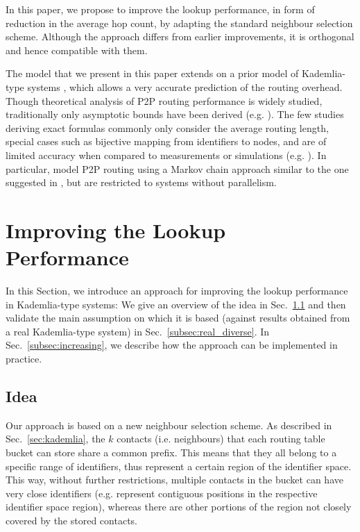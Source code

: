 \documentclass[10pt, conference, compsocconf, letterpaper]{IEEEtran}
\begin{document}
In this paper, we propose to improve the lookup performance, in form of reduction in the average hop count, by adapting the standard neighbour selection scheme. Although the approach differs from earlier improvements, it is orthogonal and hence compatible with them. 
 
The model that we present in this paper extends on a prior model of Kademlia-type systems \cite{roos13comprehending}, which allows a very accurate prediction of the routing overhead.
Though theoretical analysis of P2P routing performance is widely studied, traditionally only asymptotic bounds have been derived (e.g. \cite{stoica2001chord,rowstron2001pastry, Maymounkov02Kademlia,malkhi2002viceroy}).
The few studies deriving exact formulas commonly only consider the average routing length, special cases such as bijective mapping from identifiers to nodes, and are of limited accuracy when compared to measurements or simulations (e.g.
\cite{stutzbach06improving,spognardi2006formal, rai2007performance}).
In particular, \cite{spognardi2006formal, rai2007performance} model P2P routing using a Markov chain approach similar to 
the one suggested in \cite{roos13comprehending}, but are restricted to systems without parallelism.



\section{Improving the Lookup Performance} \label{sec:solution}

In this Section, we introduce an approach for improving the lookup performance in Kademlia-type systems: We give an overview of the idea in Sec.~\ref{subsec:idea} and then validate the main assumption on which it is based (against results obtained from a real Kademlia-type system) in Sec.~\ref{subsec:real_diverse}. In Sec.~\ref{subsec:increasing}, we describe how the approach can be implemented in practice. 

\subsection{Idea} \label{subsec:idea}

Our approach is based on a new neighbour selection scheme. As described in Sec.~\ref{sec:kademlia}, the $k$ contacts (i.e. neighbours) that each routing table bucket can store share a common prefix. This means that they all belong to a specific range of identifiers, thus represent a certain region of the identifier space. 
This way, without further restrictions, multiple contacts in the bucket can have very close identifiers (e.g. represent contiguous positions in the respective identifier space region), whereas there are other portions of the region not closely covered by the stored contacts.
\end{document}
